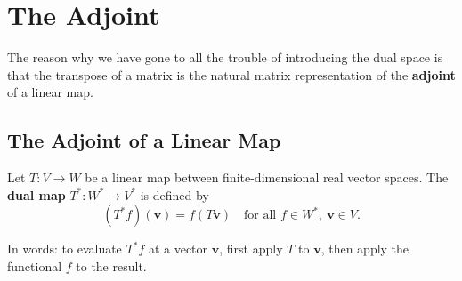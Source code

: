 \documentclass[11pt]{article}
\begin{document}
\section*{\huge The Adjoint}

The reason why we have gone to all the trouble of introducing the dual space is that the transpose of a matrix is the natural matrix representation of the \textbf{adjoint} of a linear map. 

\subsection*{\huge The Adjoint of a Linear Map}

Let $ T: V \to W $ be a linear map between finite-dimensional real vector spaces.  
The \textbf{dual map} $ T^*: W^* \to V^* $ is defined by
\[
(T^* f)(\mathbf{v}) = f(T\mathbf{v}) \quad \text{for all } f \in W^*,\ \mathbf{v} \in V.
\]

In words: to evaluate $ T^* f $ at a vector $ \mathbf{v} $, first apply $ T $ to $ \mathbf{v} $, then apply the functional $ f $ to the result.  
\end{document}
